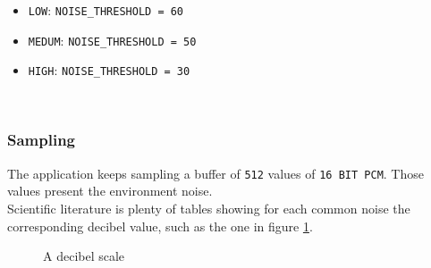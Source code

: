 \documentclass[conference, 11pt]{IEEEtran}
\begin{document}
\begin{itemize}
	\item \texttt{LOW}: \texttt{NOISE\_THRESHOLD = 60}
	\item \texttt{MEDUM}:  \texttt{NOISE\_THRESHOLD = 50}
	\item \texttt{HIGH}:  \texttt{NOISE\_THRESHOLD = 30}
\end{itemize}~

\subsubsection{\textbf{Sampling}}
The application keeps sampling a buffer of \texttt{512} values of \texttt{16 BIT PCM}. Those values present the environment noise.\\ Scientific literature is plenty of tables showing for each common noise the corresponding decibel value, such as the one in figure \ref{img:decibels}. 

\begin{figure}[!ht]
\begin{center}
\caption{A decibel scale}
\label{img:decibels}
\end{center}
\end{figure}
\end{document}
